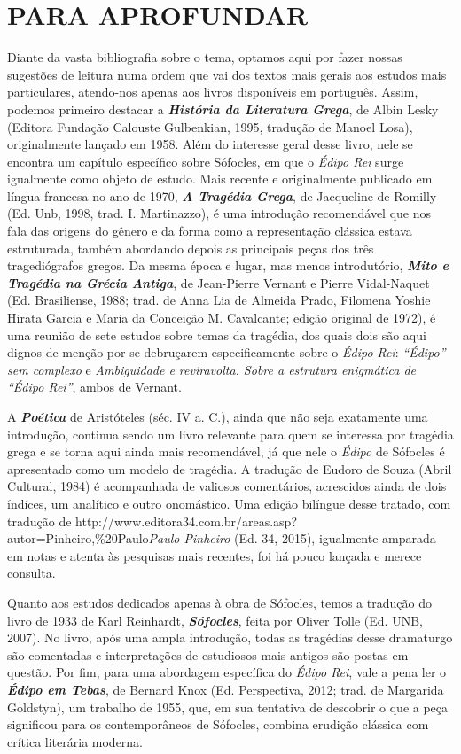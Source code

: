 \chapter{PARA APROFUNDAR}

Diante da vasta bibliografia sobre o tema, optamos aqui por fazer nossas
sugestões de leitura numa ordem que vai dos textos mais gerais aos
estudos mais particulares, atendo-nos apenas aos livros disponíveis em
português. Assim, podemos primeiro destacar a \emph{\textbf{História da
Literatura Grega}}, de Albin Lesky (Editora Fundação Calouste
Gulbenkian, 1995, tradução de Manoel Losa), originalmente lançado em
1958. Além do interesse geral desse livro, nele se encontra um capítulo
específico sobre Sófocles, em que o \emph{Édipo Rei} surge igualmente
como objeto de estudo. Mais recente e originalmente publicado em língua
francesa no ano de 1970, \emph{\textbf{A Tragédia Grega}}, de Jacqueline
de Romilly (Ed. Unb, 1998, trad. I. Martinazzo), é uma introdução
recomendável que nos fala das origens do gênero e da forma como a
representação clássica estava estruturada, também abordando depois as
principais peças dos três tragediógrafos gregos. Da mesma época e lugar,
mas menos introdutório, \emph{\textbf{Mito e Tragédia na Grécia
Antiga}}, de Jean-Pierre Vernant e Pierre Vidal-Naquet (Ed. Brasiliense,
1988; trad. de Anna Lia de Almeida Prado, Filomena Yoshie Hirata Garcia
e Maria da Conceição M. Cavalcante; edição original de 1972), é uma
reunião de sete estudos sobre temas da tragédia, dos quais dois são aqui
dignos de menção por se debruçarem especificamente sobre o \emph{Édipo
Rei}: \emph{``Édipo'' sem complexo} e \emph{Ambiguidade e reviravolta.
Sobre a estrutura enigmática de ``Édipo Rei''}, ambos de Vernant.

A \emph{\textbf{Poética}} de Aristóteles (séc. IV a. C.), ainda que não
seja exatamente uma introdução, continua sendo um livro relevante para
quem se interessa por tragédia grega e se torna aqui ainda mais
recomendável, já que nele o \emph{Édipo} de Sófocles é apresentado como
um modelo de tragédia. A tradução de Eudoro de Souza (Abril Cultural,
1984) é acompanhada de valiosos comentários, acrescidos ainda de dois
índices, um analítico e outro onomástico. Uma edição bilíngue desse
tratado, com tradução
de {http://www.editora34.com.br/areas.asp?autor=Pinheiro,\%20Paulo}{\emph{Paulo
Pinheiro}} (Ed. 34, 2015), igualmente amparada em notas e atenta às
pesquisas mais recentes, foi há pouco lançada e merece consulta.

Quanto aos estudos dedicados apenas à obra de Sófocles, temos a tradução
do livro de 1933 de Karl Reinhardt, \emph{\textbf{Sófocles}}, feita por
Oliver Tolle (Ed. UNB, 2007). No livro, após uma ampla introdução, todas
as tragédias desse dramaturgo são comentadas e interpretações de
estudiosos mais antigos são postas em questão. Por fim, para uma
abordagem específica do \emph{Édipo Rei}, vale a pena ler o
\emph{\textbf{Édipo em Tebas}}, de Bernard Knox (Ed. Perspectiva, 2012;
trad. de Margarida Goldstyn), um trabalho de 1955, que, em sua tentativa
de descobrir o que a peça significou para os contemporâneos de Sófocles,
combina erudição clássica com crítica literária moderna.

